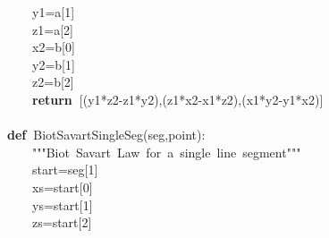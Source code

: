 \documentclass{article}
\newcommand{\hlstd}[1]{\textcolor[rgb]{0,0,0}{#1}}
\newcommand{\hlnum}[1]{\textcolor[rgb]{0.16,0.16,1}{#1}}
\newcommand{\hlstr}[1]{\textcolor[rgb]{1,0,0}{#1}}
\newcommand{\hlsym}[1]{\textcolor[rgb]{0,0,0}{#1}}
\newcommand{\hlkwa}[1]{\textcolor[rgb]{0,0,0}{\bf{#1}}}
\newcommand{\hlkwd}[1]{\textcolor[rgb]{0,0,0.51}{#1}}
\begin{document}
\hlstd{}\hlstd{\ \ \ \ }\hlstd{y1}\hlsym{=}\hlstd{a}\hlsym{{[}}\hlstd{}\hlnum{1}\hlstd{}\hlsym{{]}}\hspace*{\fill}\\
\hlstd{}\hlstd{\ \ \ \ }\hlstd{z1}\hlsym{=}\hlstd{a}\hlsym{{[}}\hlstd{}\hlnum{2}\hlstd{}\hlsym{{]}}\hspace*{\fill}\\
\hlstd{}\hlstd{\ \ \ \ }\hlstd{x2}\hlsym{=}\hlstd{b}\hlsym{{[}}\hlstd{}\hlnum{0}\hlstd{}\hlsym{{]}}\hspace*{\fill}\\
\hlstd{}\hlstd{\ \ \ \ }\hlstd{y2}\hlsym{=}\hlstd{b}\hlsym{{[}}\hlstd{}\hlnum{1}\hlstd{}\hlsym{{]}}\hspace*{\fill}\\
\hlstd{}\hlstd{\ \ \ \ }\hlstd{z2}\hlsym{=}\hlstd{b}\hlsym{{[}}\hlstd{}\hlnum{2}\hlstd{}\hlsym{{]}}\hspace*{\fill}\\
\hlstd{}\hlstd{\ \ \ \ }\hlstd{}\hlkwa{return\ }\hlstd{}\hlsym{{[}(}\hlstd{y1}\hlsym{{*}}\hlstd{z2}\hlsym{{-}}\hlstd{z1}\hlsym{{*}}\hlstd{y2}\hlsym{),(}\hlstd{z1}\hlsym{{*}}\hlstd{x2}\hlsym{{-}}\hlstd{x1}\hlsym{{*}}\hlstd{z2}\hlsym{),(}\hlstd{x1}\hlsym{{*}}\hlstd{y2}\hlsym{{-}}\hlstd{y1}\hlsym{{*}}\hlstd{x2}\hlsym{){]}}\hspace*{\fill}\\
\hlstd{}\hspace*{\fill}\\
\hlkwa{def\ }\hlstd{}\hlkwd{\textunderscore Biot\textunderscore Savart\textunderscore SingleSeg}\hlstd{}\hlsym{(}\hlstd{seg}\hlsym{,}\hlstd{point}\hlsym{):}\hspace*{\fill}\\
\hlstd{}\hlstd{\ \ \ \ }\hlstd{}\hlstr{"""Biot\ Savart\ Law\ for\ a\ single\ line\ segment"""}\hlstd{\hspace*{\fill}\\
}\hlstd{\ \ \ \ }\hlstd{start}\hlsym{=}\hlstd{seg}\hlsym{{[}}\hlstd{}\hlnum{1}\hlstd{}\hlsym{{]}}\hspace*{\fill}\\
\hlstd{}\hlstd{\ \ \ \ }\hlstd{xs}\hlsym{=}\hlstd{start}\hlsym{{[}}\hlstd{}\hlnum{0}\hlstd{}\hlsym{{]}}\hspace*{\fill}\\
\hlstd{}\hlstd{\ \ \ \ }\hlstd{ys}\hlsym{=}\hlstd{start}\hlsym{{[}}\hlstd{}\hlnum{1}\hlstd{}\hlsym{{]}}\hspace*{\fill}\\
\hlstd{}\hlstd{\ \ \ \ }\hlstd{zs}\hlsym{=}\hlstd{start}\hlsym{{[}}\hlstd{}\hlnum{2}\hlstd{}\hlsym{{]}}\hspace*{\fill}\\
\end{document}
